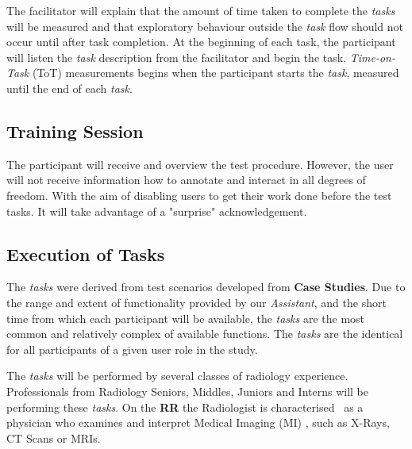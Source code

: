 \clearpage

The facilitator will explain that the amount of time taken to complete the \textit{tasks} will be measured and that exploratory behaviour outside the \textit{task} flow should not occur until after task completion. At the beginning of each task, the participant will listen the \textit{task} description from the facilitator and begin the task. \textit{Time-on-Task} (ToT) measurements begins when the participant starts the \textit{task}, measured until the end of each \textit{task}.



\subsection{Training Session}

The participant will receive and overview the test procedure. However, the user will not receive information how to annotate and interact in all degrees of freedom. With the aim of disabling users to get their work done before the test tasks. It will take advantage of a "surprise" acknowledgement.


\subsection{Execution of Tasks}

The \textit{tasks} were derived from test scenarios developed from \textbf{Case Studies}. Due to the range and extent of functionality provided by our \textit{Assistant}, and the short time from which each participant will be available, the \textit{tasks} are the most common and relatively complex of available functions. The \textit{tasks} are the identical for all participants of a given user role in the study.

The \textit{tasks} will be performed by several classes of radiology experience. Professionals from Radiology Seniors, Middles, Juniors and Interns will be performing these \textit{tasks}. On the \textbf{RR} the Radiologist is characterised~\cite{ehrlich2016patient, miglioretti2007radiologist} as a physician who examines and interpret Medical Imaging (MI) \cite{kobashi2017evaluation}, such as X-Rays, CT Scans or MRIs.

